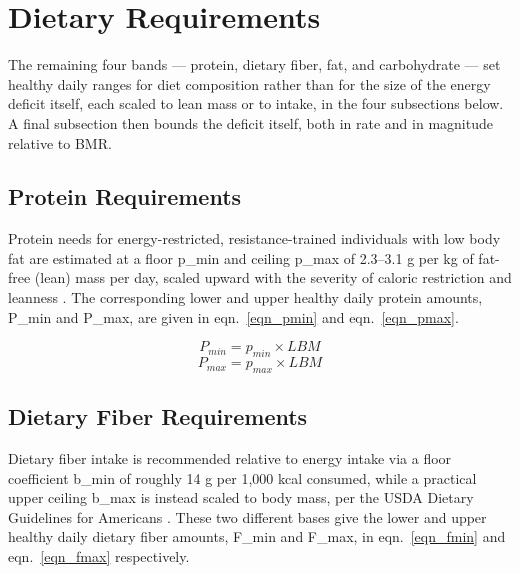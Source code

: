 
\section{Dietary Requirements}

The remaining four bands — protein, dietary fiber, fat, and carbohydrate — set healthy daily ranges for diet composition rather than for the size of the energy deficit itself, each scaled to lean mass or to intake, in the four subsections below. A final subsection then bounds the deficit itself, both in rate and in magnitude relative to BMR.

\subsection{Protein Requirements}

Protein needs for energy-restricted, resistance-trained individuals with low body fat are estimated at a floor p\_min and ceiling p\_max of 2.3–3.1 g per kg of fat-free (lean) mass per day, scaled upward with the severity of caloric restriction and leanness \cite{ref_helms2014}. The corresponding lower and upper healthy daily protein amounts, P\_min and P\_max, are given in eqn.~\eqref{eqn_pmin} and eqn.~\eqref{eqn_pmax}.

\begin{equation}
\label{eqn_pmin}
P_{min} = p_{min} × LBM
\end{equation}
\begin{equation}
\label{eqn_pmax}
P_{max} = p_{max} × LBM
\end{equation}

\subsection{Dietary Fiber Requirements}

Dietary fiber intake is recommended relative to energy intake via a floor coefficient b\_min of roughly 14 g per 1,000 kcal consumed, while a practical upper ceiling b\_max is instead scaled to body mass, per the USDA Dietary Guidelines for Americans \cite{ref_usda2020}. These two different bases give the lower and upper healthy daily dietary fiber amounts, F\_min and F\_max, in eqn.~\eqref{eqn_fmin} and eqn.~\eqref{eqn_fmax} respectively.

